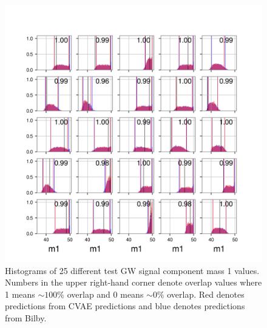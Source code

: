 \documentclass[%
showpacs,
 amsmath,amssymb,
 aps,
 twocolumn,
 prl,
 reprint,
floatfix,
]{revtex4-1}
\begin{document}
%
%
\begin{figure}
    \includegraphics[width=\columnwidth]{images/latest-1d_0.png}
    \caption{\label{fig:1D_overlap} Histograms of 
    25 different test GW signal component mass 1 values. 
    Numbers in the upper right-hand corner denote overlap 
    values where 1 means $\sim{100}\%$ overlap and 0 
    means $\sim{0}\%$ overlap.
    Red denotes predictions from CVAE predictions and blue 
    denotes predictions from Bilby.}
\end{figure}
\end{document}
